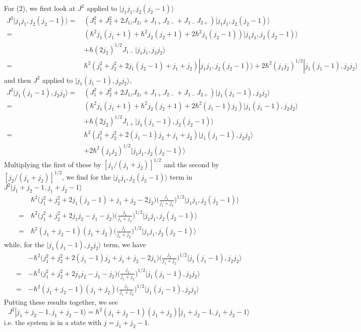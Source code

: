 \documentclass[../principles-of-quantum-mechanics.tex]{subfiles}
\begin{document}
\begin{questions}
\begin{solution}
			For (2), we first look at $J^2$ applied to $|j_1j_1, j_2(j_2 - 1)\rangle$
			\begin{align*}
				J^2|j_1j_1, j_2(j_2 - 1)\rangle =\,&(J_1^2 + J_2^2 + 2J_{1z}J_{2z} + J_{1+}J_{2-} + J_{1-}J_{2+})|j_1j_1, j_2(j_2 - 1)\rangle \\
				=\,&(\hbar^2j_1(j_1 + 1) + \hbar^2j_2(j_2 + 1) + 2\hbar^2j_1(j_2 - 1))|j_1j_1, j_2(j_2 - 1)\rangle \\
				&+ \hbar(2j_2)^{1/2}J_{1-}|j_1j_1, j_2j_2\rangle \\
				=\,&\hbar^2(j_1^2 + j_2^2 + 2j_1(j_2 - 1) + j_1 + j_2)|j_1j_1, j_2(j_2 - 1)\rangle + 2\hbar^2(j_1j_2)^{1/2}|j_1(j_1 - 1), j_2j_2\rangle
			\end{align*}
			and then $J^2$ applied to $|j_1(j_1 - 1), j_2j_2\rangle$,
			\begin{align*}
				J^2|j_1(j_1 - 1), j_2j_2\rangle =\,&(J_1^2 + J_2^2 + 2J_{1z}J_{2z} + J_{1+}J_{2-} + J_{1-}J_{2+})|j_1(j_1 - 1), j_2j_2\rangle \\
				=\,&(\hbar^2j_1(j_1 + 1) + \hbar^2j_2(j_2 + 1) + 2\hbar^2(j_1 - 1)j_2)|j_1(j_1 - 1), j_2j_2\rangle \\
				&+ \hbar(2j_2)^{1/2}J_{1+}|j_1(j_1 - 1), j_2(j_2 - 1)\rangle \\
				=\,&\hbar^2(j_1^2 + j_2^2 + 2(j_1 - 1)j_2 + j_1 + j_2)|j_1(j_1 - 1), j_2j_2\rangle \\
				&+ 2\hbar^2(j_1j_2)^{1/2}|j_1j_1, j_2(j_2 - 1)\rangle
			\end{align*}
			Multiplying the first of these by $[j_1/(j_1 + j_2)]^{1/2}$ and the second by $[j_2/(j_1 + j_2)]^{1/2}$, we find for the $|j_1j_1, j_2(j_2 - 1)\rangle$ term in $J^2|j_1 + j_2 - 1, j_1 + j_2 - 1\rangle$
			\begin{align*}
				&\hbar^2\Big(j_1^2 + j_2^2 + 2j_1(j_2 - 1) + j_1 + j_2 - 2j_2\Big)\Big(\frac{j_1}{j_1 + j_2}\Big)^{1/2}|j_1j_1, j_2(j_2 - 1)\rangle \\
				=\,&\hbar^2\Big(j_1^2 + j_2^2 + 2j_1j_2 - j_1 - j_2\Big)\Big(\frac{j_1}{j_1 + j_2}\Big)^{1/2}|j_1j_1, j_2(j_2 - 1)\rangle \\
				=\,&\hbar^2(j_1 + j_2 - 1)(j_1 + j_2)\Big(\frac{j_1}{j_1 + j_2}\Big)^{1/2}|j_1j_1, j_2(j_2 - 1)\rangle
			\end{align*}
			while, for the $|j_1(j_1 - 1), j_2j_2\rangle$ term, we have
			\begin{align*}
				&{-\hbar^2}\Big(j_1^2 + j_2^2 + 2(j_1 - 1)j_2 + j_1 + j_2 - 2j_1\Big)\Big(\frac{j_2}{j_1 + j_2}\Big)^{1/2}|j_1(j_1 - 1), j_2j_2\rangle \\
				=\,&{-\hbar^2}\Big(j_1^2 + j_2^2 + 2j_1j_2 - j_1 - j_2\Big)\Big(\frac{j_2}{j_1 + j_2}\Big)^{1/2}|j_1(j_1 - 1), j_2j_2\rangle \\
				=\,&{-\hbar^2}(j_1 + j_2 - 1)(j_1 + j_2)\Big(\frac{j_2}{j_1 + j_2}\Big)^{1/2}|j_1(j_1 - 1), j_2j_2\rangle
			\end{align*}
			Putting these results together, we see
			$$J^2|j_1 + j_2 - 1, j_1 + j_2 - 1\rangle = \hbar^2(j_1 + j_2 - 1)(j_1 + j_2)|j_1 + j_2 - 1, j_1 + j_2 - 1\rangle$$
			i.e. the system is in a state with $j = j_1 + j_2 - 1$.
		\end{solution}
		

\end{questions}
\end{document}
